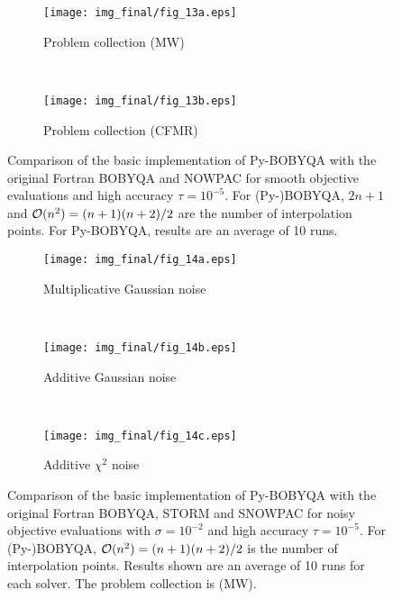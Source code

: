 \begin{figure}
	\centering
	\begin{subfigure}[b]{0.48\textwidth}
		\texttt{[image: img\_final/fig\_13a.eps]}
		\caption{Problem collection (MW)}
		\label{fig_bobyqa_basic_smooth_mw}
	\end{subfigure}
	~
	\begin{subfigure}[b]{0.48\textwidth}
		\texttt{[image: img\_final/fig\_13b.eps]}
		\caption{Problem collection (CFMR)}
		\label{fig_bobyqa_basic_smooth_cutest}
	\end{subfigure}
	\caption{Comparison of the basic implementation of Py-BOBYQA with the original Fortran BOBYQA and NOWPAC for smooth objective evaluations and high accuracy $\tau=10^{-5}$. For (Py-)BOBYQA, $2n+1$ and $\mathcal{O}(n^2)=(n+1)(n+2)/2$ are the number of interpolation points. For Py-BOBYQA, results are an average of 10 runs.}
	\label{fig_bobyqa_basic_smooth}
\end{figure}

\begin{figure}
	\centering
	\begin{subfigure}[b]{0.48\textwidth}
		\texttt{[image: img\_final/fig\_14a.eps]}
		\caption{Multiplicative Gaussian noise}
		\label{fig_bobyqa_basic_noise2_ubgsn_noisyf}
	\end{subfigure}
	~
	\begin{subfigure}[b]{0.48\textwidth}
		\texttt{[image: img\_final/fig\_14b.eps]}
		\caption{Additive Gaussian noise}
		\label{fig_bobyqa_basic_noise2_addgsn_noisyf}
	\end{subfigure}
	\\
	\begin{subfigure}[b]{0.48\textwidth}
		\texttt{[image: img\_final/fig\_14c.eps]}
		\caption{Additive $\chi^2$ noise}
		\label{fig_bobyqa_basic_noise2_addchisq_noisyf}
	\end{subfigure}
	\caption{Comparison of the basic implementation of Py-BOBYQA with the original Fortran BOBYQA, STORM and SNOWPAC for noisy objective evaluations with $\sigma=10^{-2}$ and high accuracy $\tau=10^{-5}$. For (Py-)BOBYQA, $\mathcal{O}(n^2)=(n+1)(n+2)/2$ is the number of interpolation points. Results shown are an average of 10 runs for each solver. The problem collection is (MW).}
	\label{fig_bobyqa_basic_noise2}
\end{figure}

